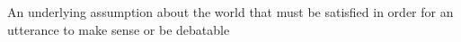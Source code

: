 An underlying assumption about the world that must be satisfied in order for an utterance to make sense or be debatable
